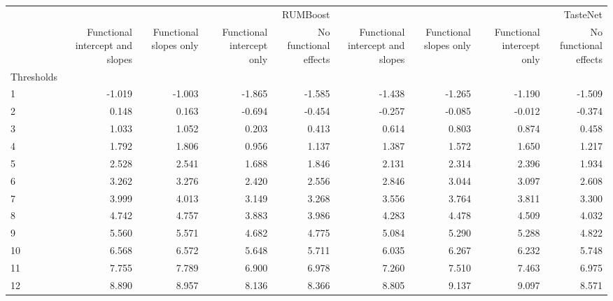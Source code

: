 \begin{tabular}{lrrrrrrrr}
\toprule
 & \multicolumn{4}{r}{RUMBoost} & \multicolumn{4}{r}{TasteNet} \\
 & Functional intercept and slopes & Functional slopes only & Functional intercept only & No functional effects & Functional intercept and slopes & Functional slopes only & Functional intercept only & No functional effects \\
Thresholds &  &  &  &  &  &  &  &  \\
\midrule
1 & -1.019 & -1.003 & -1.865 & -1.585 & -1.438 & -1.265 & -1.190 & -1.509 \\
2 & 0.148 & 0.163 & -0.694 & -0.454 & -0.257 & -0.085 & -0.012 & -0.374 \\
3 & 1.033 & 1.052 & 0.203 & 0.413 & 0.614 & 0.803 & 0.874 & 0.458 \\
4 & 1.792 & 1.806 & 0.956 & 1.137 & 1.387 & 1.572 & 1.650 & 1.217 \\
5 & 2.528 & 2.541 & 1.688 & 1.846 & 2.131 & 2.314 & 2.396 & 1.934 \\
6 & 3.262 & 3.276 & 2.420 & 2.556 & 2.846 & 3.044 & 3.097 & 2.608 \\
7 & 3.999 & 4.013 & 3.149 & 3.268 & 3.556 & 3.764 & 3.811 & 3.300 \\
8 & 4.742 & 4.757 & 3.883 & 3.986 & 4.283 & 4.478 & 4.509 & 4.032 \\
9 & 5.560 & 5.571 & 4.682 & 4.775 & 5.084 & 5.290 & 5.288 & 4.822 \\
10 & 6.568 & 6.572 & 5.648 & 5.711 & 6.035 & 6.267 & 6.232 & 5.748 \\
11 & 7.755 & 7.789 & 6.900 & 6.978 & 7.260 & 7.510 & 7.463 & 6.975 \\
12 & 8.890 & 8.957 & 8.136 & 8.366 & 8.805 & 9.137 & 9.097 & 8.571 \\
\bottomrule
\end{tabular}
